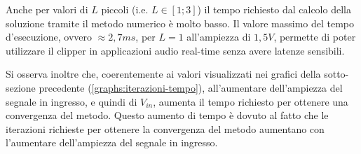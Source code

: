 			Anche per valori di $L$ piccoli (i.e. $L \in [1;3]$) il tempo richiesto dal calcolo della soluzione tramite il metodo numerico è molto basso. Il valore massimo del tempo d'esecuzione, ovvero $\approx 2,7ms$, per $L = 1$ all'ampiezza di $1,5V$, permette di poter utilizzare il clipper in applicazioni audio real-time senza avere latenze sensibili.
			
			Si osserva inoltre che, coerentemente ai valori visualizzati nei grafici della sotto-sezione precedente (\ref{graphs:iterazioni-tempo}), all'aumentare dell'ampiezza del segnale in ingresso, e quindi di $V_{in}$, aumenta il tempo richiesto per ottenere una convergenza del metodo. Questo aumento di tempo è dovuto al fatto che le iterazioni richieste per ottenere la convergenza del metodo aumentano con l'aumentare dell'ampiezza del segnale in ingresso.